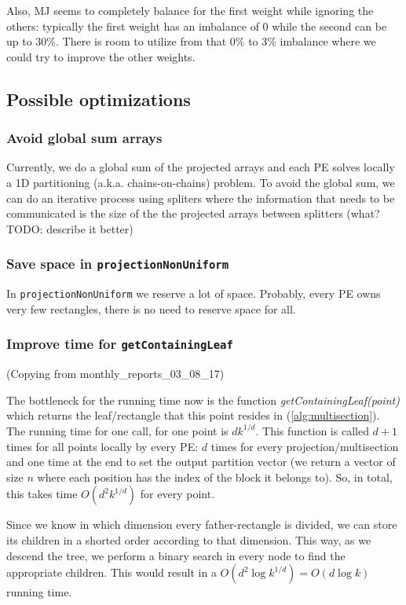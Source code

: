 \documentclass[a4paper,10pt]{article}
\begin{document}
Also, MJ seems to completely balance for the first weight while ignoring the others: typically the
first weight has an imbalance of 0 while the second can be up to 30\%. There is room to utilize
from that 0\% to 3\% imbalance where we could try to improve the other weights.




\subsection{Possible optimizations}

\subsubsection{Avoid global sum arrays} \label{sec:opt}
Currently, we do a global sum of the projected arrays and each PE solves locally a 1D
partitioning (a.k.a. chains-on-chains) problem. To avoid the global sum, we can do an iterative 
process using spliters where the information that needs to be communicated is the size of the 
the projected arrays between splitters (what? TODO: describe it better)

\subsubsection{Save space in \texttt{projectionNonUniform}} \label{par:space}
In \texttt{projectionNonUniform} we reserve a lot of space. Probably, every PE owns very few rectangles,
there is no need to reserve space for all.

\subsubsection{Improve time for \texttt{getContainingLeaf}} \label{par:getleaf}
(Copying from monthly\_reports\_03\_08\_17)

The bottleneck for the running time now is the function \emph{getContainingLeaf(point)} which returns the leaf/rectangle that this point resides in (\cref{alg:multisection}). The running time for one call, for one point is $d k^{1/d}$. This function is  called $d+1$ times for all points locally by every PE: $d$ times for every projection/multisection and one time at the end to set the output partition vector (we return a vector of size $n$ where each position has the index of the block it belongs to). So, in total, this takes time $O(d^2 k^{1/d})$ for every point.
 
Since we know in which dimension every father-rectangle is divided, we can store its children in a shorted order according to that dimension. This way, as we descend the tree, we perform a binary search in every node to find the appropriate children. This would result in a $O(d^2 \log k^{1/d}) = O(d \log k)$ running time.
\end{document}
